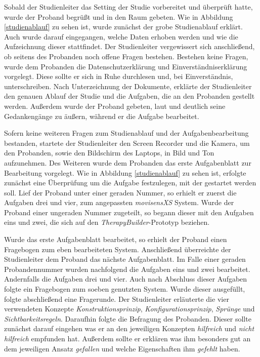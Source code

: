 Sobald der Studienleiter das Setting der Studie vorbereitet und überprüft hatte, wurde der Proband begrüßt und in den Raum gebeten. Wie in Abbildung \ref{studienablauf} zu sehen ist, wurde zunächst der grobe Studienablauf erklärt. Auch wurde darauf eingegangen, welche Daten erhoben werden und wie die Aufzeichnung dieser stattfindet. Der Studienleiter vergewissert sich anschließend, ob seitens des Probanden noch offene Fragen bestehen. Bestehen keine Fragen, wurde dem Probanden die Datenschutzerklärung und Einverständniserklärung vorgelegt. Diese sollte er sich in Ruhe durchlesen und, bei Einverständnis, unterschreiben. Nach Unterzeichnung der Dokumente, erklärte der Studienleiter den genauen Ablauf der Studie und die Aufgaben, die an den Probanden gestellt werden. Außerdem wurde der Proband gebeten, laut und deutlich seine Gedankengänge zu äußern, während er die Aufgabe bearbeitet.

Sofern keine weiteren Fragen zum Studienablauf und der Aufgabenbearbeitung bestanden, startete der Studienleiter den Screen Recorder und die Kamera, um den Probanden, sowie den Bildschirm des Laptops, in Bild und Ton aufzunehmen. Des Weiteren wurde dem Probanden das erste Aufgabenblatt zur Bearbeitung vorgelegt. Wie in Abbildung \ref{studienablauf} zu sehen ist, erfolgte zunächst eine Überprüfung um die Aufgabe festzulegen, mit der gestartet werden soll. Lief der Proband unter einer geraden Nummer, so erhielt er zuerst die Aufgaben drei und vier, zum angepassten \emph{movisensXS} System. Wurde der Proband einer ungeraden Nummer zugeteilt, so begann dieser mit den Aufgaben eins und zwei, die sich auf den \emph{TherapyBuilder}-Prototyp beziehen. 

Wurde das erste Aufgabenblatt bearbeitet, so erhielt der Proband einen Fragebogen zum eben bearbeiteten System. Anschließend überreichte der Studienleiter dem Proband das nächste Aufgabenblatt. Im Falle einer geraden Probandennummer wurden nachfolgend die Aufgaben eins und zwei bearbeitet. Andernfalls die Aufgaben drei und vier. Auch nach Abschluss dieser Aufgaben folgte ein Fragebogen zum soeben genutzten System. Wurde dieser ausgefüllt, folgte abschließend eine Fragerunde. Der Studienleiter erläuterte die vier verwendeten Konzepte \emph{Konstruktionsprinzip}, \emph{Konfigurationsprinzip}, \emph{Sprünge} und \emph{Sichtbarkeitsregeln}. Daraufhin folgte die Befragung des Probanden. Dieser sollte zunächst darauf eingehen was er an den jeweiligen Konzepten \emph{hilfreich} und \emph{nicht hilfreich} empfunden hat. Außerdem sollte er erklären was ihm besonders gut an dem jeweiligen Ansatz \emph{gefallen} und welche Eigenschaften ihm \emph{gefehlt} haben. 

